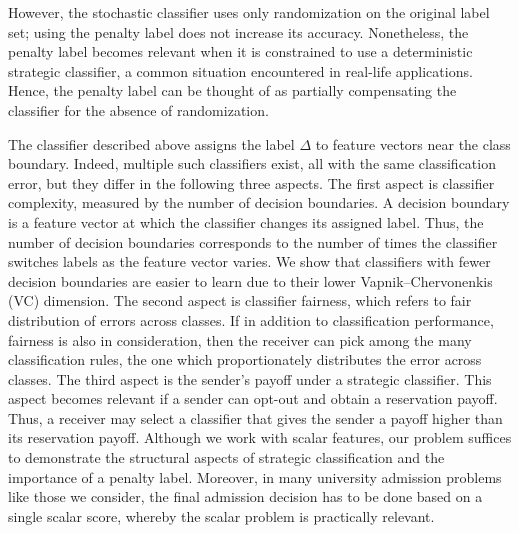 However, the stochastic classifier uses only randomization on the original label set; using the penalty label does not increase its accuracy. Nonetheless, the penalty label becomes relevant when it is constrained to use a deterministic strategic classifier, a common situation encountered in real-life applications. Hence, the penalty label can be thought of as partially compensating the classifier for the absence of randomization.

The classifier described above assigns the label $\Delta$ to feature vectors near the class boundary. Indeed, multiple such classifiers exist, all with the same classification error, but they differ in the following three aspects.
The first aspect is classifier complexity, measured by the number of decision boundaries. A decision boundary is a feature vector at which the classifier changes its assigned label. Thus, the number of decision boundaries corresponds to the number of times the classifier switches labels as the feature vector varies. We show that classifiers with fewer decision boundaries are easier to learn due to their lower Vapnik--Chervonenkis (VC) dimension.
The second aspect is classifier fairness, which refers to fair distribution of errors across classes. If in addition to classification performance, fairness is also in consideration, then the receiver can pick among the many classification rules, the one which proportionately distributes the error across classes. The third aspect is the sender's payoff under a strategic classifier. This aspect becomes relevant if a sender can opt-out and obtain a reservation payoff. Thus, a receiver may select a classifier that gives the sender a payoff higher than its reservation payoff. Although we work with scalar features, our problem suffices to demonstrate the structural aspects of strategic classification and the importance of a penalty label. Moreover, in many university admission problems like those we consider, the final admission decision has to be done based on a single scalar score, whereby the scalar problem is practically relevant.

